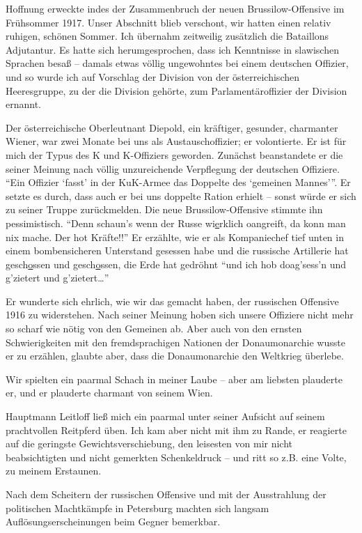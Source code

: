 \documentclass[a5paper,pagesize,10pt,twoside=true]{scrbook}
\begin{document}
Hoffnung erweckte indes der Zusammenbruch der neuen Brussilow-Offen\-sive im Frühsommer 1917. Unser Abschnitt blieb verschont, wir hatten einen relativ ruhigen, schönen Sommer. Ich übernahm zeitweilig zusätzlich die Bataillons Adjutantur. Es hatte sich herumgesprochen, dass ich Kenntnisse in slawischen Sprachen besaß -- damals etwas völlig ungewohntes bei einem deutschen Offizier, und so wurde ich auf Vorschlag der Division von der österreichischen Heeresgruppe, zu der die Division gehörte, zum Parlamentäroffizier der Division ernannt.

Der österreichische Oberleutnant Diepold, ein kräftiger, gesunder, charmanter Wiener, war zwei Monate bei uns als Austauschoffizier; er volontierte. Er ist für mich der Typus des K und K-Offiziers geworden. Zunächst beanstandete er die seiner Meinung nach völlig unzureichende Verpflegung der deutschen Offiziere. \enquote{Ein Offizier \enquote{fasst} in der KuK-Armee das Doppelte des \enquote{gemeinen Mannes}}. Er setzte es durch, dass auch er bei uns doppelte Ration erhielt -- sonst würde er sich zu seiner Truppe zurückmelden. Die neue Brussilow-Offensive stimmte ihn pessimistisch. \enquote{Denn schaun's wenn der Russe wi\underline{e}rklich oangreift, da konn man nix mache. Der hot Kräfte!!} Er erzählte, wie er als Kompaniechef tief unten in einem bombensicheren Unterstand gesessen habe und die russische Artillerie hat gesch\underline{o}ssen und gesch\underline{o}ssen, die Erde hat gedröhnt \enquote{und ich hob doag'sess'n und g'zietert und g'zietert\dots}

Er wunderte sich ehrlich, wie wir das gemacht haben, der russischen Offensive 1916 zu widerstehen. Nach seiner Meinung hoben sich unsere Offiziere nicht mehr so scharf wie nötig von den Gemeinen ab. Aber auch von den ernsten Schwierigkeiten mit den fremdsprachigen Nationen der Donaumonarchie wusste er zu erzählen, glaubte aber, dass die Donaumonarchie den Weltkrieg überlebe.

Wir spielten ein paarmal Schach in meiner Laube -- aber am liebsten plauderte er, und er plauderte charmant von seinem Wien.

Hauptmann Leitloff ließ mich ein paarmal unter seiner Aufsicht auf seinem prachtvollen Reitpferd üben. Ich kam aber nicht mit ihm zu Rande, er reagierte auf die geringste Gewichtsverschiebung, den leisesten von mir nicht beabsichtigten und nicht gemerkten Schenkeldruck -- und ritt so z.B. eine Volte, zu meinem Erstaunen.

Nach dem Scheitern der russischen Offensive und mit der Ausstrahlung der politischen Machtkämpfe in Petersburg machten sich langsam Auflösungserscheinungen beim Gegner bemerkbar.
\end{document}
